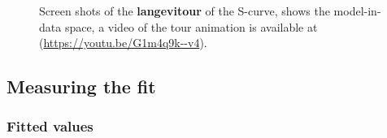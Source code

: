 \documentclass[
  12pt]{article}
\begin{document}
\begin{figure}[H]
\begin{minipage}{0.33\linewidth}
{}

\subcaption{\label{fig-scurve_sc2}}

\end{minipage}%
%
\begin{minipage}{0.33\linewidth}


\subcaption{\label{fig-scurve_sc3}}

\end{minipage}%

\caption{\label{fig-scurve_sc}Screen shots of the \textbf{langevitour}
of the S-curve, shows the model-in-data space, a video of the tour
animation is available at (\url{https://youtu.be/G1m4q9k--v4}).}

\end{figure}%

\subsection{Measuring the fit}\label{sec-summary}

\subsubsection{Fitted values}\label{fitted-values}
\end{document}
